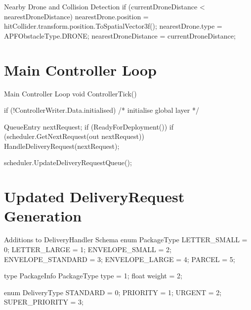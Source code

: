 \documentclass[a4paper,11pt,titlepage]{report}
\begin{document}
\begin{appendices}
\begin{sexylisting}[colback=white]{Nearby Drone and Collision Detection}
{{{      if (currentDroneDistance < nearestDroneDistance)
      {
        nearestDrone.position
          = hitCollider.transform.position.ToSpatialVector3f();
        nearestDrone.type = APFObstacleType.DRONE;
        nearestDroneDistance = currentDroneDistance;
      }
    }
  }
}
\end{sexylisting}

\section{Main Controller Loop}
\begin{sexylisting}[colback=white]{Main Controller Loop}
void ControllerTick()
{
  if (!ControllerWriter.Data.initialised)
  {
    /* initialise global layer */
  }

  QueueEntry nextRequest;
  if (ReadyForDeployment())
  {
    if (scheduler.GetNextRequest(out nextRequest))
    {
      HandleDeliveryRequest(nextRequest);
    }
  }

  scheduler.UpdateDeliveryRequestQueue();
}
\end{sexylisting}

\section{Updated DeliveryRequest Generation}
\begin{sexylisting}[colback=white]{Additions to DeliveryHandler Schema}
enum PackageType {
  LETTER_SMALL = 0;
  LETTER_LARGE = 1;
  ENVELOPE_SMALL = 2;
  ENVELOPE_STANDARD = 3;
  ENVELOPE_LARGE = 4;
  PARCEL = 5;
}

type PackageInfo {
  PackageType type = 1;
  float weight = 2;
}

enum DeliveryType {
  STANDARD = 0;
  PRIORITY = 1;
  URGENT = 2;
  SUPER_PRIORITY = 3;
}
\end{sexylisting}

\end{appendices}
\end{document}
